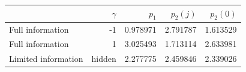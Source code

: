 \begin{tabular}{lrrrr}\toprule & $\gamma$ & $p_1$ & $p_2(j)$ & $p_2(0)$\\\midrule
Full information & -1 & 0.978971 & 2.791787 & 1.613529 \\
Full information & 1 & 3.025493 & 1.713114 & 2.633981 \\
Limited information & hidden & 2.277775 & 2.459846 & 2.339026 \\
\bottomrule\end{tabular}
